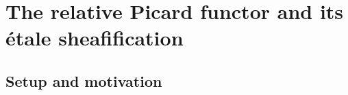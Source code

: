 \chapter{The relative Picard functor and its \'etale sheafification}
\label{chap:Picard_RelPicFunctor}



\section{Setup and motivation}
\label{sec:relpic_setup}

